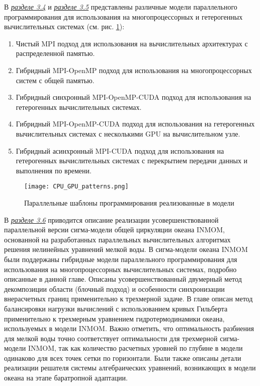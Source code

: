 В \underline{\textit{разделе 3.4}} и \underline{\textit{разделе 3.5}} представлены различные модели параллельного программирования для использования на многопроцессорных и гетерогенных вычислительных системах (см. рис. \ref{fig:patterns}):

\begin{enumerate}

\item Чистый MPI подход для использования на вычислительных архитектурах с распределенной памятью.
\item Гибридный MPI-OpenMP подход для использования на многопроцессорных систем с общей памя­тью.
\item Гибридный синхронный MPI-OpenMP-CUDA подход для использования на гетерогенных вычислительных системах.
\item Гибридный MPI-OpenMP-CUDA подход для использования на гетерогенных вычислительных системах с несколькими GPU на вычислительном узле.
\item Гибридный асинхронный MPI-CUDA подход для использования на гетерогенных вычислительных системах с перекрытием передачи данных и выполнения по времени.

\end{enumerate}

\begin{figure}[!ht]
	\texttt{[image: CPU\_GPU\_patterns.png]}
	\vspace{3pt}
	\caption{Параллельные шаблоны программирования реализованные в модели}
	\label{fig:patterns}
\end{figure}


В \underline{\textit{разделе 3.6}} приводится описание реализации усовершенствованной параллельной версии сигма-модели общей циркуляции океана INMOM, основанной на разработанных параллельных вычислительных алгоритмах решения нелинейных уравнений мелкой воды.
В сигма-модели океана INMOM были поддержаны гибридные модели параллельного программирования для использования на многопроцессорных вычислительных системах, подробно описанные в данной главе.
Описаны усовершенствованный двумерный метод декомпозиции области (блочный подход) и особенности синхронизации внерасчетных границ применительно к трехмерной задаче.
В главе описан метод баланси­ровки нагрузки вычислений с использованием кривых Гильберта применительно к трехмерным уравнением гидротермодинамики океана, используемых в модели INMOM.
Важно отметить, что оптимальность разбиения для мелкой воды точно соответствует оптимальности для трехмерной сигма-модели INMOM, так как количество расчетных уровней по глубине в модели одинаково для всех точек сетки по горизонтали.
Были также описаны детали реализации решателя системы алгебраических уравнений, возникающих в модели океана на этапе баратропной адаптации.

